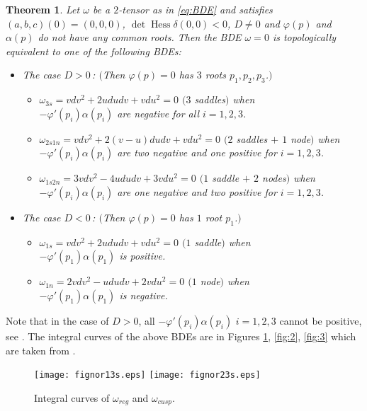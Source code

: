 \documentclass[a4paper, 12pt]{article}
\newtheorem{theorem}{Theorem}[section]
\theoremstyle{definition}
\numberwithin{equation}{section}
\begin{document}
\begin{theorem}\label{prop:1}
{\rm \cite[Theorem 4.1]{BTbinary}}
Let\/ $\omega$ 
be a\/ $2$-tensor as in\/ \eqref{eq:BDE} and
satisfies\/ $(a,b,c)(0)=(0,0,0)$,
$\det{\operatorname{Hess}}\delta(0,0)<0$,
$D\ne0$
and\/ ${\varphi}(p)$ and\/ $\alpha(p)$ do not have any common roots.
Then the BDE\/ $\omega=0$ is topologically equivalent to
one of the following BDEs\/{\rm :}
\begin{itemize}
\item The case\/ $D>0$\,{\rm :}
$($Then\/ ${\varphi}(p)=0$ has\/ $3$ roots\/ $p_1,p_2,p_3$.$)$
\begin{itemize}
\item $\omega_{3s}=vdv^2+2ududv+vdu^2=0$ $(3$ saddles\/$)$
when\\ $-{\varphi}'(p_i)\alpha(p_i)$ are
negative for all\/ $i=1,2,3$.
\item $\omega_{2s1n}=vdv^2+2(v-u)dudv+vdu^2=0$ $(2$ saddles\/ $+$ $1$ node\/$)$
when\/ $-{\varphi}'(p_i)\alpha(p_i)$ are
two negative and one positive for\/ $i=1,2,3$.
\item $\omega_{1s2n}=3vdv^2-4ududv+3vdu^2=0$ $(1$ saddle\/ $+$ $2$ nodes\/$)$
when\/ $-{\varphi}'(p_i)\alpha(p_i)$ are
one negative and two positive for\/ $i=1,2,3$.
\end{itemize}
\item The case\/ $D<0$\,{\rm :} 
$($Then\/ ${\varphi}(p)=0$ has\/ $1$ root\/ $p_1$.$)$
\begin{itemize}
\item $\omega_{1s}=vdv^2+2ududv+vdu^2=0$ $(1$ saddle\/$)$
when\\ $-{\varphi}'(p_1)\alpha(p_1)$ is
positive.
\item $\omega_{1n}=2vdv^2-ududv+2vdu^2=0$ $(1$ node\/$)$
when\\ $-{\varphi}'(p_1)\alpha(p_1)$ is
negative.
\end{itemize}
\end{itemize}
\end{theorem}
Note that in the case of $D>0$,
all 
$-{\varphi}'(p_i)\alpha(p_i)$ $i=1,2,3$ 
cannot be positive, see \cite{BTbinary}.
The integral curves of the above 
BDEs are in Figures \ref{fig:1}, \ref{fig:2}, \ref{fig:3}
which are taken from \cite{BTbinary}.

\begin{figure}[!ht]
\centering
\texttt{[image: fignor13s.eps]}
\hspace{1mm}
\texttt{[image: fignor23s.eps]}
\caption{Integral curves of
$\omega_{reg}$ and $\omega_{cusp}$.}
\label{fig:1}
\end{figure}
\end{document}
